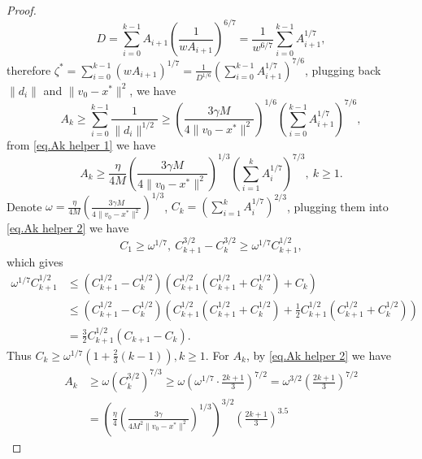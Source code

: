 \documentclass{mcom-l}
\numberwithin{equation}{section}
\begin{document}
\begin{proof}
\begin{equation*}
        D=\sum_{i=0}^{k-1} A_{i+1}\left(\frac{1}{w A_{i+1}}\right)^{6 / 7}=\frac{1}{w^{6 / 7}} \sum_{i=0}^{k-1} A_{i+1}^{1 / 7},
    \end{equation*}
    therefore $\zeta^*=\sum_{i=0}^{k-1}\left(w A_{i+1}\right)^{1 / 7}=\frac{1}{D^{1 / 6}}\left(\sum_{i=0}^{k-1} A_{i+1}^{1 / 7}\right)^{7 / 6}$, plugging back $\|d_i\| $ and $ \|v_0-x^*\|^2$, we have
    \begin{equation*}
        A_k\geq\sum_{i=0}^{k-1}\frac{1}{\|d_i\|^{1/2}} \geq \left (\frac{3\gamma M}{4\|v_0-x^*\|^2}\right)^{1/6} \left(\sum_{i=0}^{k-1} A_{i+1}^{1 / 7}\right)^{7 / 6},
    \end{equation*}
    from \eqref{eq.Ak helper 1} we have
    \begin{equation}
        \label{eq.Ak helper 2}
        A_k \geq \frac{\eta}{4M}\left (\frac{3\gamma M}{4\|v_0-x^*\|^2}\right)^{1/3} \left(\sum_{i=1}^{k} A_{i}^{1 / 7}\right)^{7 / 3}, \ k\geq 1.
    \end{equation}
    Denote $\omega = \frac{\eta}{4M}\left (\frac{3\gamma M}{4\|v_0-x^*\|^2}\right)^{1/3}$, $C_k =\left(\sum_{i=1}^k A_i^{1 / 7}\right)^{2 / 3}$, plugging them into \eqref{eq.Ak helper 2} we have
    \begin{equation*}
        C_1\geq\omega^{1/7},\ C_{k+1}^{3 / 2}-C_k^{3 / 2} \geq \omega^{1 / 7} C_{k+1}^{1 / 2},
    \end{equation*}
    which gives
    \begin{equation*}
        \begin{aligned}
            \omega^{1 / 7} C_{k+1}^{1 / 2} & \leq\left(C_{k+1}^{1 / 2}-C_k^{1 / 2}\right)\left(C_{k+1}^{1 / 2}\left(C_{k+1}^{1 / 2}+C_k^{1 / 2}\right)+C_k\right)                                                                 \\
                                           & \leq\left(C_{k+1}^{1 / 2}-C_k^{1 / 2}\right)\left(C_{k+1}^{1 / 2}\left(C_{k+1}^{1 / 2}+C_k^{1 / 2}\right)+\frac{1}{2} C_{k+1}^{1 / 2}\left(C_{k+1}^{1 / 2}+C_k^{1 / 2}\right)\right) \\
                                           & =\frac{3}{2} C_{k+1}^{1 / 2}\left(C_{k+1}-C_k\right).
        \end{aligned}
    \end{equation*}
    Thus $C_k \geq \omega^{1 / 7}\left(1+\frac{2}{3}(k-1)\right), k \geq 1$. For $A_k$, by \eqref{eq.Ak helper 2} we have
    \begin{equation*}
        \begin{aligned}
            A_k & \geq \omega\left(C_k^{3 / 2}\right)^{7 / 3} \geq \omega\left(\omega^{1 / 7} \cdot \frac{2 k+1}{3}\right)^{7 / 2}=\omega^{3 / 2}\left(\frac{2 k+1}{3}\right)^{7 / 2} \\
                & =\left(\frac{\eta}{4}\left (\frac{3\gamma}{4M^2\|v_0-x^*\|^2}\right)^{1/3}\right)^{3 / 2}\left(\frac{2 k+1}{3}\right)^{3.5}
        \end{aligned}
    \end{equation*}
\end{proof}
\end{document}
